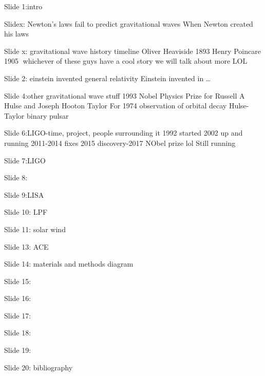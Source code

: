 Slide 1:intro

Slidex:
Newton's laws fail to predict gravitational waves
When Newton created his laws

Slide x: gravitational wave history timeline
Oliver Heaviside 1893
Henry Poincare 1905
^^^whichever of these guys have a cool story we will talk about more LOL

Slide 2: einstein invented general relativity
Einstein invented in …

Slide 4:other gravitational wave stuff
1993 Nobel Physics Prize for Russell A Hulse and Joseph Hooton Taylor
For 1974 observation of orbital decay Hulse-Taylor binary pulsar

Slide 6:LIGO-time, project, people surrounding it
1992 started
2002 up and running
2011-2014 fixes
2015 discovery-2017 NObel prize lol
Still running

Slide 7:LIGO

Slide 8:

Slide 9:LISA

Slide 10: LPF

Slide 11: solar wind

Slide 13: ACE

Slide 14: materials and methods diagram

Slide 15:

Slide 16:

Slide 17:

Slide 18:

Slide 19:

Slide 20: bibliography



